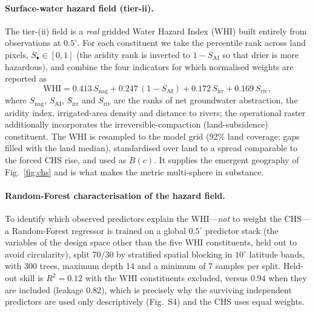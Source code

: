 \documentclass[10pt]{article}
\begin{document}
\paragraph*{Surface-water hazard field (tier-ii).}
The tier-(ii) field is a \emph{real} gridded Water Hazard Index (WHI) built
entirely from observations at $0.5^{\circ}$. For each constituent we take the
percentile rank across land pixels, $S_\bullet\in[0,1]$ (the aridity rank is
inverted to $1-S_{\mathrm{AI}}$ so that drier is more hazardous), and combine the
four indicators for which normalised weights are reported as
\begin{equation}
\mathrm{WHI} = 0.413\,S_{\mathrm{nag}} + 0.247\,(1-S_{\mathrm{AI}})
 + 0.172\,S_{\mathrm{irr}} + 0.169\,S_{\mathrm{riv}},
\label{eq:whi}
\end{equation}
where $S_{\mathrm{nag}}$, $S_{\mathrm{AI}}$, $S_{\mathrm{irr}}$ and
$S_{\mathrm{riv}}$ are the ranks of net groundwater abstraction, the aridity
index, irrigated-area density and distance to rivers; the operational raster
additionally incorporates the irreversible-compaction (land-subsidence)
constituent. The WHI is resampled to the model grid (92\% land coverage; gaps
filled with the land median), standardised over land to a spread comparable to the
forced CHS rise, and used as $B(c)$. It supplies the emergent geography of
Fig.~\ref{fig:chs} and is what makes the metric multi-sphere in substance.

\paragraph*{Random-Forest characterisation of the hazard field.}
To identify which observed predictors explain the WHI---\emph{not} to weight the
CHS---a Random-Forest regressor\citep{breiman2001random} is trained on a global
$0.5^{\circ}$ predictor stack (the variables of the design space other than the
five WHI constituents, held out to avoid circularity), split 70/30 by stratified
spatial blocking in $10^{\circ}$ latitude bands, with 300 trees, maximum depth 14
and a minimum of 7 samples per split. Held-out skill is $R^2=0.12$ with the WHI
constituents excluded, versus $0.94$ when they are included (leakage $0.82$),
which is precisely why the surviving independent predictors are used only
descriptively (Fig.~S4) and the CHS uses equal weights.
\end{document}
